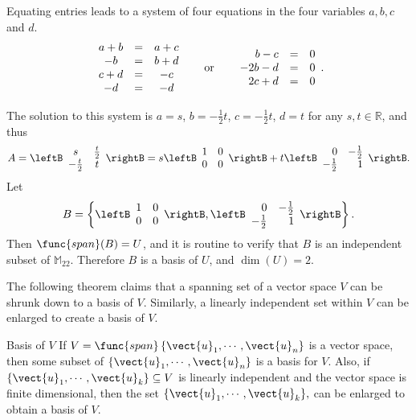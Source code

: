 \begin{solution}
Equating entries leads to a system of four equations in the four
variables $a,b,c$ and $d$.
\[ \begin{array}{ccc}
a+b & = & a + c \\
-b & = & b + d \\
c + d & = & -c \\
-d & = & -d \end{array} \hspace*{.2in}\mbox{ or }\hspace*{.2in}
\begin{array}{rcc}
b - c & = & 0 \\
-2b - d & = & 0 \\
2c + d & = & 0 
\end{array}.  \] 

The solution to this system is
$a=s$, $b=-\frac{1}{2}t$, $c=-\frac{1}{2}t$,  $d=t$ for any $s,t\in\mathbb{R}$, 
and thus 
\[ A=\leftB\begin{array}{cc} s & \frac{t}{2} \\
-\frac{t}{2} & t \end{array}\rightB
= s\leftB\begin{array}{cc} 1 & 0 \\ 0 & 0 \end{array}\rightB
+ t\leftB\begin{array}{rr} 0  & -\frac{1}{2} \\ 
-\frac{1}{2} & 1 \end{array}\rightB .\]
Let 
\[ B=\left\{ 
\leftB\begin{array}{cc} 1 & 0 \\ 0 & 0 \end{array}\rightB,
\leftB\begin{array}{rr} 0  & -\frac{1}{2} \\
-\frac{1}{2} & 1 \end{array}\rightB\right\}.\]
Then $\func{span}(B)=U$, and it is routine to verify that $B$ is
an independent subset of $\mathbb{M}_{22}$.  
Therefore $B$ is a basis of $U$, and $\dim(U)=2$.
\end{solution}

The following theorem claims that a spanning set of a vector space $V$ can be shrunk down to a basis of $V$. Similarly, a linearly independent set within $V$ can be enlarged to create a basis of $V$.

\begin{theorem}{Basis of $V$}\label{thm:basisfromspanninglinind}
 If $V=\func{span}\left\{ \vect{u}_{1},\cdots ,\vect{u}
_{n}\right\} $ is a vector space, then some subset of $\{\vect{u}_{1},\cdots ,\vect{u}_{n}\}$
is a basis for $V.$ Also, if $\{\vect{u}_{1},\cdots ,\vect{u}
_{k}\}\subseteq V$ is linearly independent and the vector space is finite
dimensional,
 then the set $\{
\vect{u}_{1},\cdots ,\vect{u}_{k}\},$ can be enlarged to obtain a basis
of $V.$
\end{theorem}

